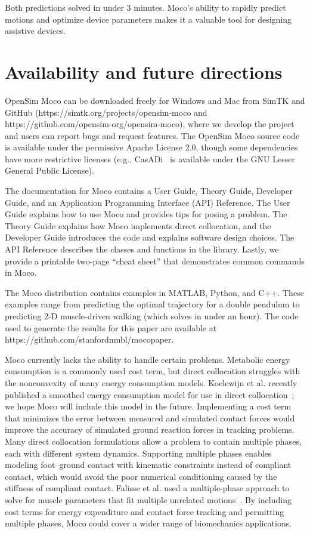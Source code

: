 \documentclass[10pt,letterpaper]{article}
\begin{document}
Both predictions solved in under 3 minutes. Moco's ability to rapidly predict motions and optimize device parameters makes it a valuable tool for designing assistive devices.


\section*{Availability and future directions}

OpenSim Moco can be downloaded freely for Windows and Mac from SimTK and GitHub (https://simtk.org/projects/opensim-moco and https://github.com/opensim-org/opensim-moco), where we develop the project and users can report bugs and request features. The OpenSim Moco source code is available under the permissive Apache License 2.0, though some dependencies have more restrictive licenses (e.g., CasADi~\cite{Andersson:2019} is available under the GNU Lesser General Public License).

The documentation for Moco contains a User Guide, Theory Guide, Developer Guide, and an Application Programming Interface (API) Reference. The User Guide explains how to use Moco and provides tips for posing a problem. The Theory Guide explains how Moco implements direct collocation, and the Developer Guide introduces the code and explains software design choices. The API Reference describes the classes and functions in the library. Lastly, we provide a printable two-page “cheat sheet” that demonstrates common commands in Moco.

The Moco distribution contains examples in MATLAB, Python, and C++. These examples range from predicting the optimal trajectory for a double pendulum to predicting 2-D muscle-driven walking (which solves in under an hour). The code used to generate the results for this paper are available at https://github.com/stanfordnmbl/mocopaper.

Moco currently lacks the ability to handle certain problems. Metabolic energy consumption is a commonly used cost term, but direct collocation struggles with the nonconvexity of many energy consumption models. Koelewijn et al. recently published a smoothed energy consumption model for use in direct collocation~\cite{Koelewijn:2019}; we hope Moco will include this model in the future. Implementing a cost term that minimizes the error between measured and simulated contact forces would improve the accuracy of simulated ground reaction forces in tracking problems. Many direct collocation formulations allow a problem to contain multiple phases, each with different system dynamics. Supporting multiple phases enables modeling foot–ground contact with kinematic constraints instead of compliant contact, which would avoid the poor numerical conditioning caused by the stiffness of compliant contact. Falisse et al. used a multiple-phase approach to solve for muscle parameters that fit multiple unrelated motions~\cite{Falisse:2016}. By including cost terms for energy expenditure and contact force tracking and permitting multiple phases, Moco could cover a wider range of biomechanics applications.
\end{document}

